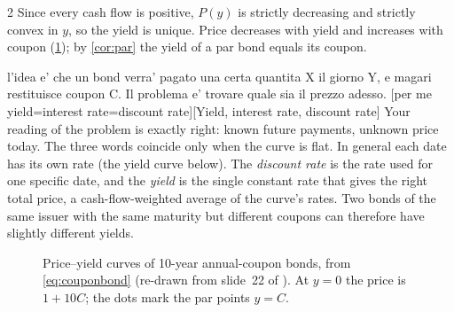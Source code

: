 \begin{paracol}{2}
Since every cash flow is positive, $P(y)$ is strictly decreasing and strictly convex in $y$, so the
yield is unique. Price decreases with yield and increases with coupon
(\cref{fig:priceyield}); by \cref{cor:par} the yield of a par bond equals its coupon.\begin{answer}{l'idea e' che un bond verra' pagato una certa quantita X il giorno Y, e magari restituisce coupon C. Il problema e' trovare quale sia il prezzo adesso. [per me yield=interest rate=discount rate]}[Yield, interest rate, discount rate]
Your reading of the problem is exactly right: known future payments, unknown price today. The three
words coincide only when the curve is flat. In general each date has its own rate (the yield curve
below). The \emph{discount rate} is the rate used for one specific date, and the \emph{yield} is the
single constant rate that gives the right total price, a cash-flow-weighted average of the curve's
rates. Two bonds of the same issuer with the same maturity but different coupons can therefore have
slightly different yields.
\end{answer}

\begin{figure}[ht]
\centering
{}
\caption{Price--yield curves of 10-year annual-coupon bonds, from \eqref{eq:couponbond}
(re-drawn from slide~22 of ). At $y=0$ the price is $1+10C$; the dots mark the
par points $y=C$.}\label{fig:priceyield}
\end{figure}


\end{paracol}
